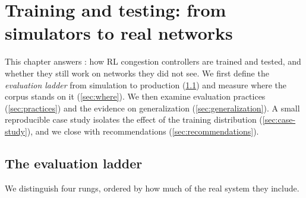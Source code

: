 \chapter{Training and testing: from simulators to real networks}
\label{ch:training}

This chapter answers : how RL congestion controllers are trained and tested, and whether they still work on networks they did not see. We first define the \emph{evaluation ladder} from simulation to production (\cref{sec:ladder}) and measure where the corpus stands on it (\cref{sec:where}). We then examine evaluation practices (\cref{sec:practices}) and the evidence on generalization (\cref{sec:generalization}). A small reproducible case study isolates the effect of the training distribution (\cref{sec:case-study}), and we close with recommendations (\cref{sec:recommendations}).

\section{The evaluation ladder}
\label{sec:ladder}

We distinguish four rungs, ordered by how much of the real system they include.

